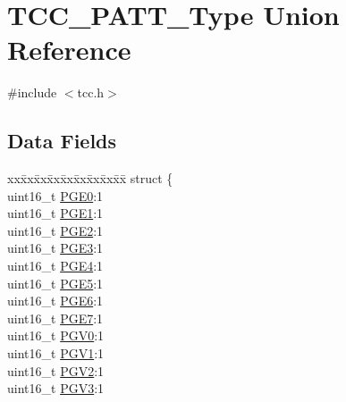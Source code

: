 \hypertarget{union_t_c_c___p_a_t_t___type}{}\section{T\+C\+C\+\_\+\+P\+A\+T\+T\+\_\+\+Type Union Reference}
\label{union_t_c_c___p_a_t_t___type}


{\ttfamily \#include $<$tcc.\+h$>$}

\subsection*{Data Fields}
\begin{DoxyCompactItemize}
\item 
\begin{tabbing}
xx\=xx\=xx\=xx\=xx\=xx\=xx\=xx\=xx\=\kill
struct \{\\
\>uint16\_t \mbox{\hyperlink{union_t_c_c___p_a_t_t___type_aaff06f2b23ff179239d944930d172b06}{PGE0}}:1\\
\>uint16\_t \mbox{\hyperlink{union_t_c_c___p_a_t_t___type_a72ec5b1e784f8c3ca81f16eb99fefa8a}{PGE1}}:1\\
\>uint16\_t \mbox{\hyperlink{union_t_c_c___p_a_t_t___type_ad38e6fdff613f641ac4f3bde346ad520}{PGE2}}:1\\
\>uint16\_t \mbox{\hyperlink{union_t_c_c___p_a_t_t___type_af4c6eb8d96c4f56f22cedfa7a5769e38}{PGE3}}:1\\
\>uint16\_t \mbox{\hyperlink{union_t_c_c___p_a_t_t___type_ad231ccad8902d67df7a8cb338b028490}{PGE4}}:1\\
\>uint16\_t \mbox{\hyperlink{union_t_c_c___p_a_t_t___type_a8564c376b91f5db4bf8a2844b816d6e4}{PGE5}}:1\\
\>uint16\_t \mbox{\hyperlink{union_t_c_c___p_a_t_t___type_a777eea7a3ec573686fe1c44899d0d778}{PGE6}}:1\\
\>uint16\_t \mbox{\hyperlink{union_t_c_c___p_a_t_t___type_a5ed41b57c371082e3da68b8fc2a57f93}{PGE7}}:1\\
\>uint16\_t \mbox{\hyperlink{union_t_c_c___p_a_t_t___type_a8cd2f58616ce37d050385f23e2520a37}{PGV0}}:1\\
\>uint16\_t \mbox{\hyperlink{union_t_c_c___p_a_t_t___type_a8be884f89437e1e65b38bc15e3533eb2}{PGV1}}:1\\
\>uint16\_t \mbox{\hyperlink{union_t_c_c___p_a_t_t___type_a0156c9f220512d032d9431ae965485f7}{PGV2}}:1\\
\>uint16\_t \mbox{\hyperlink{union_t_c_c___p_a_t_t___type_a4f8248a06489c0afb5a276bc657105ad}{PGV3}}:1\\

\end{tabbing}
\end{DoxyCompactItemize}
